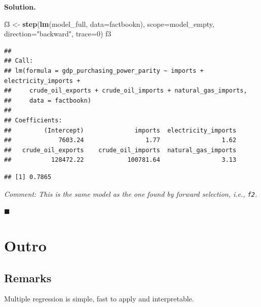 \documentclass[10pt,b5paper,krantz1]{krantz}
\newenvironment{Shaded}{\begin{snugshade}}{\end{snugshade}}
\newcommand{\DataTypeTok}[1]{\textcolor[rgb]{0.27,0.27,0.27}{#1}}
\newcommand{\DecValTok}[1]{\textcolor[rgb]{0.06,0.06,0.06}{#1}}
\newcommand{\KeywordTok}[1]{\textcolor[rgb]{0.27,0.27,0.27}{\textbf{#1}}}
\newcommand{\NormalTok}[1]{#1}
\newcommand{\OperatorTok}[1]{\textcolor[rgb]{0.43,0.43,0.43}{\textbf{#1}}}
\newcommand{\StringTok}[1]{\textcolor[rgb]{0.5,0.5,0.5}{#1}}
\newenvironment{solution}{%
\bigskip\noindent\textbf{Solution. }%
\it\ignorespaces%
\ignorespaces%
}{\ignorespaces%
\hfill$\blacksquare$%
}
\begin{document}
\begin{solution}

\begin{Shaded}
\begin{Highlighting}[]
\NormalTok{f3 <-}\StringTok{ }\KeywordTok{step}\NormalTok{(}\KeywordTok{lm}\NormalTok{(model_full, }\DataTypeTok{data=}\NormalTok{factbookn),}
    \DataTypeTok{scope=}\NormalTok{model_empty,}
    \DataTypeTok{direction=}\StringTok{"backward"}\NormalTok{, }\DataTypeTok{trace=}\DecValTok{0}\NormalTok{)}
\NormalTok{f3}
\end{Highlighting}
\end{Shaded}

\begin{verbatim}
## 
## Call:
## lm(formula = gdp_purchasing_power_parity ~ imports + electricity_imports + 
##     crude_oil_exports + crude_oil_imports + natural_gas_imports, 
##     data = factbookn)
## 
## Coefficients:
##         (Intercept)              imports  electricity_imports  
##             7603.24                 1.77                 1.62  
##   crude_oil_exports    crude_oil_imports  natural_gas_imports  
##           128472.22            100781.64                 3.13
\end{verbatim}

\begin{Shaded}
\end{Shaded}

\begin{verbatim}
## [1] 0.7865
\end{verbatim}

\emph{Comment: This is the same model as the one
found by forward selection, i.e., \texttt{f2}.}

\end{solution}

\hypertarget{outro-1}{%
\section{Outro}\label{outro-1}}

\hypertarget{remarks-1}{%
\subsection{Remarks}\label{remarks-1}}

Multiple regression is simple, fast to apply and interpretable.
\end{document}
